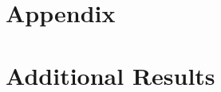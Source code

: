 \documentclass[11pt, english, letterpaper]{article}
\begin{document}
% 

% 

% 

% 

% 

% 


\printbibliography

\setcounter{page}{1}
\setcounter{table}{0}
\setcounter{figure}{0}
\setcounter{section}{0}
\renewcommand{\thetable}{\thesection\arabic{table}}
\renewcommand{\thefigure}{\thesection\arabic{figure}}
\renewcommand{\thepage}{\thesection\arabic{page}}
\renewcommand\thesection{\Alph{section}}
\renewcommand\thesubsection{\thesection.\arabic{subsection}}
\newpage
\section*{Appendix}
\section{Additional Results}

\end{document}
